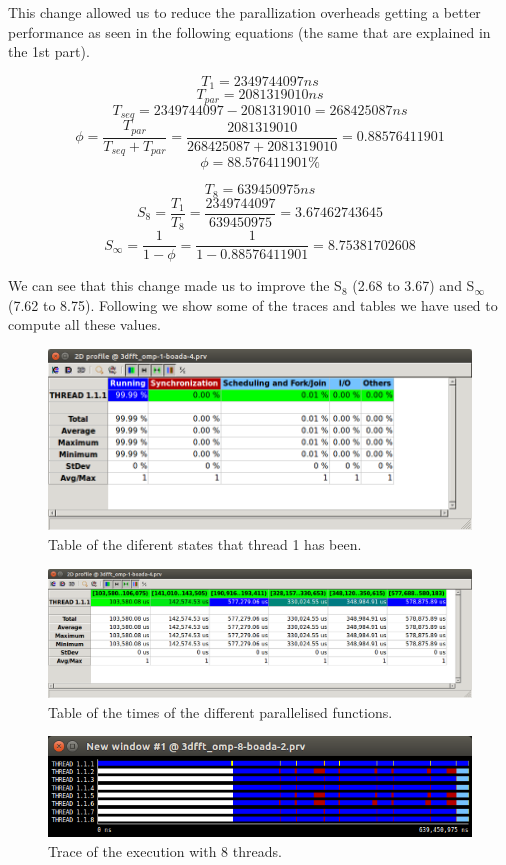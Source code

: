 \documentclass[12pt, a4paper]{article}
\begin{document}
This change allowed us to reduce the parallization overheads getting a better performance as seen in the following equations (the same that are explained in the 1st part).

\[T_1 = 2349744097 ns \]
\[T_{par} = 2081319010 ns \]
\[T_{seq} = 2349744097 - 2081319010 = 268425087 ns \]
\[\phi = \dfrac{T_{par}} {T_{seq} + T_{par}} = \dfrac{2081319010} {268425087 + 2081319010} = 0.88576411901 \]
\[\phi = 88.576411901\% \]

\[T_8 = 639450975 ns \]
\[S_8 = \dfrac{T_1}{T_8} = \dfrac{2349744097}{639450975} = 3.67462743645 \]
\[S_\infty = \dfrac{1}{1 - \phi} = \dfrac{1} {1 - 0.88576411901} = 8.75381702608 \]

We can see that this change made us to improve the S$_8$ (2.68 to 3.67) and S$_\infty$ (7.62 to 8.75). Following we show some of the traces and tables we have used to compute all these values.

\begin{figure}[H]
  \centering
  \includegraphics[scale=0.5]{./images/v2_t1}
  \caption{Table of the diferent states that thread 1 has been.}
  \label{v2_t1}
\end{figure}

\begin{figure}[H]
  \centering
  \includegraphics[scale=0.35]{./images/v2_tpar}
  \caption{Table of the times of the different parallelised functions.}
  \label{v2_tpar}
\end{figure}

\begin{figure}[H]
  \centering
  \includegraphics[scale=0.5]{./images/v2_t8}
  \caption{Trace of the execution with 8 threads.}
  \label{v2_t8}
\end{figure}
\end{document}
